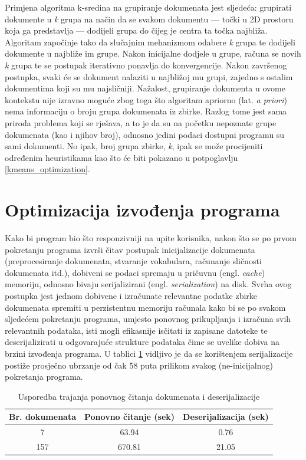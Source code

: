 \documentclass[times, utf8, zavrsni, numeric]{fer}
\begin{document}
Primjena algoritma k-sredina na grupiranje dokumenata jest sljedeća: grupirati dokumente u \textit{k} grupa na način da se svakom dokumentu — točki u 2D prostoru koja ga predstavlja — dodijeli grupa do čijeg je centra ta točka najbliža. Algoritam započinje tako da slučajnim mehanizmom odabere \textit{k} grupa te dodijeli dokumente u najbliže im grupe. Nakon inicijalne dodjele u grupe, računa se novih \textit{k} grupa te se postupak iterativno ponavlja do konvergencije. Nakon završenog postupka, svaki će se dokument nalaziti u najbližoj mu grupi, zajedno s ostalim dokumentima koji su mu najsličniji.
Nažalost, grupiranje dokumenta u ovome kontekstu nije izravno moguće zbog toga što algoritam apriorno (lat. \textit{a priori}) nema informaciju o broju grupa dokumenata iz zbirke. Razlog tome jest sama priroda problema koji se rješava, a to je da su na početku nepoznate grupe dokumenata (kao i njihov broj), odnosno jedini podaci dostupni programu su sami dokumenti. No ipak, broj grupa zbirke, \textit{k}, ipak se može procijeniti određenim heuristikama kao što će biti pokazano u potpoglavlju \ref{kmeans_optimization}.

\section{Optimizacija izvođenja programa}
Kako bi program bio što responzivniji na upite korisnika, nakon što se po prvom pokretanju programa izvrši čitav postupak inicijalizacije dokumenata (preprocesiranje dokumenata, stvaranje vokabulara, računanje sličnosti dokumenata itd.), dobiveni se podaci spremaju u pričuvnu (engl. \textit{cache}) memoriju, odnosno bivaju serijalizirani (engl. \textit{serialization}) na disk. Svrha ovog postupka jest jednom dobivene i izračunate relevantne podatke zbirke dokumenata spremiti u perzistentnu memoriju računala kako bi se po svakom sljedećem pokretanju programa, umjesto ponovnog prikupljanja i izračuna svih relevantnih podataka, isti mogli efikasnije isčitati iz zapisane datoteke te deserijalizirati u odgovarajuće strukture podataka čime se uvelike dobiva na brzini izvođenja programa. U tablici
\ref{table:serialization} vidljivo je da se korištenjem serijalizacije postiže prosječno ubrzanje od čak 58 puta prilikom svakog (ne-inicijalnog) pokretanja programa.

\begin{table}
\begin{center}
\begin{tabular}{|c|c|c|}
\hline
Br. dokumenata & Ponovno čitanje (sek) & Deserijalizacija (sek) \\
\hline
7 & 63.94 & 0.76 \\
157 & 670.81 & 21.05 \\
\hline
\end{tabular}
\end{center}
\caption{Usporedba trajanja ponovnog čitanja dokumenata i deserijalizacije}
\label{table:serialization}
\end{table}
\end{document}
